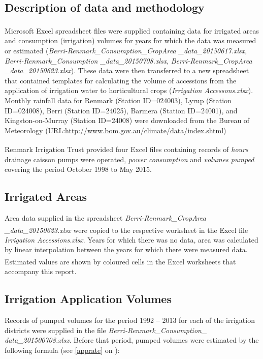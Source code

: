 \documentclass[a4paper, titlepage, 12pt]{article}\usepackage[]{graphicx}\usepackage[]{color}
\begin{document}
\begin{sffamily}
\section{Description of data and methodology}
Microsoft Excel\textsuperscript{\textregistered} spreadsheet files were supplied containing data for irrigated areas and consumption (irrigation) volumes for years for which the data was measured or estimated (\textit{Berri-Renmark\_Consumption\_CropArea \allowbreak \_data\_20150617.xlsx}, \textit{Berri-Renmark\_Consumption \allowbreak \_data\_20150708.xlsx}, \textit{Berri-Renmark\_CropArea \allowbreak \_data\_20150623.xlsx}). These data were then transferred to a new spreadsheet that contained templates for calculating the volume of accessions from the application of irrigation water to horticultural crops (\textit{Irrigation Accessons.xlsx}). Monthly rainfall data for Renmark (Station ID=024003), Lyrup (Station ID=024008), Berri (Station ID=24025), Barmera (Station ID=24001), and Kingston-on-Murray (Station ID=24008) were downloaded from the Bureau of Meteorology (URL:\url{http://www.bom.gov.au/climate/data/index.shtml})

Renmark Irrigation Trust provided four Excel\textsuperscript{\textregistered} files containing records of \textit{hours} drainage caisson pumps were operated, \textit{power consumption} and \textit{volumes pumped} covering the period October 1998 to May 2015. 

\subsection{Irrigated Areas} \label{irrarea} Area data supplied in the spreadsheet \textit{Berri-Renmark\_CropArea \allowbreak \_data\_20150623.xlsx} were copied to the respective worksheet in the Excel\textsuperscript{\textregistered} file \textit{Irrigation Accessions.xlsx}. Years for which there was no data, area was calculated by linear interpolation between the years for which there were measured data. Estimated values are shown by coloured cells in the Excel\textsuperscript{\textregistered} worksheets that accompany this report. 

\subsection{Irrigation Application Volumes} \label{irrvol} Records of pumped volumes for the period 1992 -- 2013 for each of the irrigation districts were supplied in the file \textit{Berri-Renmark\_Consumption\_ \allowbreak data\_201500708.xlsx}. Before that period, pumped volumes were estimated by the following formula (see \ref{apprate} on \pageref{apprate}):
 

\end{sffamily}
\end{document}
